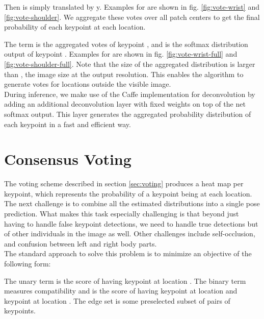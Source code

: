\documentclass{article}
\begin{document}
	
	
	


	
	
	Then  is simply  translated by y. Examples for  are shown in fig. \ref{fig:vote-wrist} and \ref{fig:vote-shoulder}. We aggregate these votes over all patch centers to get the final probability of each keypoint at each location.
	
	
	
	The term  is the aggregated votes of keypoint , and  is the softmax distribution output of keypoint . Examples for  are shown in fig. \ref{fig:vote-wrist-full} and \ref{fig:vote-shoulder-full}. Note that the size of the aggregated distribution is larger than , the image size at the output resolution. This enables the algorithm to generate votes for locations outside the visible image.\\
	


	During inference, we make use of the Caffe \cite{jia2014} implementation for deconvolution by adding an additional deconvolution layer with fixed weights  on top of the net softmax output. This layer generates the aggregated probability distribution of each keypoint in a fast and efficient way.  
	
	


	


\section{Consensus Voting}\label{sec:consensus}
The voting scheme described in section \ref{sec:voting} produces a heat map per keypoint, which represents the probability of a keypoint being at each location. The next challenge is to combine all the estimated distributions into a single pose prediction. What makes this task especially challenging is that beyond just having to handle false keypoint detections, we need to handle true detections but of other individuals in the image as well. Other challenges include self-occlusion, and confusion between left and right body parts.   \\

The standard approach to solve this problem is to minimize an objective of the following form:

The  unary term is the score of having keypoint  at location . The   binary term measures compatibility and is the score of having keypoint  at location  and keypoint  at location . The edge set  is some preselected subset of pairs of keypoints.\\
\end{document}
